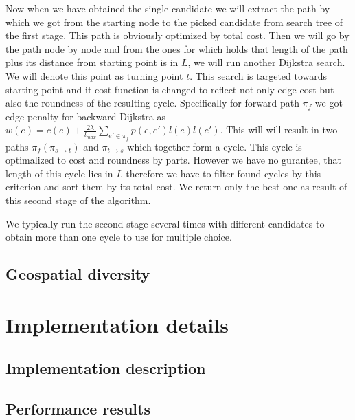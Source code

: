 \documentclass{ctuthesis}
\begin{document}
Now when we have obtained the single candidate we will extract the path by which we got from the starting node to the picked candidate from search tree of the first stage. This path is obviously optimized by total cost. Then we will go by the path node by node and from the ones for which holds that length of the path plus its distance from starting point is in \(L\), we will run another Dijkstra search. We will denote this point as turning point \(t\). This search is targeted towards starting point and it cost function is changed to reflect not only edge cost but also the roundness of the resulting cycle. Specifically for forward path \(\pi_f\) we got edge penalty for backward Dijkstra as \(w(e) = c(e) + \frac {2 \lambda} {l_{max}} \sum_{e' \in \pi_f}{p(e, e') l(e) l(e')}\). This will will result in two paths \(\pi_f (\pi_{s \rightarrow t})\) and \(\pi_{t \rightarrow s}\) which together form a cycle. This cycle is optimalized to cost and roundness by parts. However we have no gurantee, that length of this cycle lies in \(L\) therefore we have to filter found cycles by this criterion and sort them by its total cost. We return only the best one as result of this second stage of the algorithm.\par
We typically run the second stage several times with different candidates to obtain more than one cycle to use for multiple choice.


\section{Geospatial diversity}


\chapter{Implementation details}

\section{Implementation description}

\section{Performance results}
\end{document}
